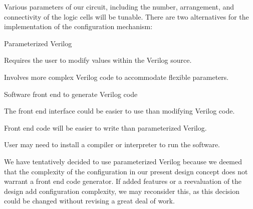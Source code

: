 Various parameters of our circuit, including the number, arrangement, and connectivity of the logic cells will be tunable.
There are two alternatives for the implementation of the configuration mechanism:
\begin{enumeration}
	\item Parameterized Verilog \
		\begin{itemlist}
			\item Requires the user to modify values within the Verilog source.
			\item Involves more complex Verilog code to accommodate flexible parameters.
		\end{itemlist}
	\item Software front end to generate Verilog code \
		\begin{itemlist}
			\item The front end interface could be easier to use than modifying Verilog code.
			\item Front end code will be easier to write than parameterized Verilog.
			\item User may need to install a compiler or interpreter to run the software.
		\end{itemlist}
\end{enumeration}

We have tentatively decided to use parameterized Verilog because we deemed that the complexity of the configuration in our present design concept does not warrant a front end code generator.
If added features or a reevaluation of the design add configuration complexity, we may reconsider this, as this decision could be changed without revising a great deal of work.






